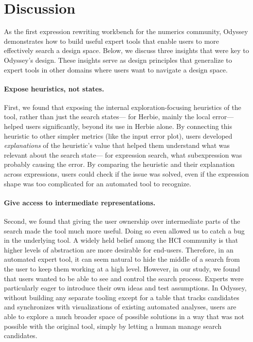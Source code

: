 \section{Discussion} \label{sec:discussion}
As the first expression rewriting workbench for the numerics community,
  Odyssey demonstrates how to build useful expert tools
  that enable users to more effectively search a design space. 
  Below, we discuss three insights that were key to Odyssey's design. 
  These insights serve as design principles that generalize to expert tools in other domains where users want to navigate a design space.

\paragraph{Expose heuristics, not states.}
  First, we found that exposing the internal exploration-focusing heuristics of the tool,
  rather than just the search states---%
  for Herbie, mainly the local error---helped users significantly,
  beyond its use in Herbie alone. %
By connecting this heuristic to other simpler metrics (like the input error plot), 
  users developed \textit{explanations} of the heuristic's value
  that helped them understand
  what was relevant about the search state---%
  for expression search,
  what subexpression was probably causing the error. 
By comparing the heuristic and their explanation across expressions, 
  users could check if the issue was solved, 
  even if the expression shape was too complicated for an automated tool to recognize.

  \paragraph{Give access to intermediate representations.}
  Second, we found that giving the user ownership over intermediate parts of the search
  made the tool much more useful. Doing so even allowed us to catch a bug in the underlying tool.
  A widely held belief among the HCI community is that higher levels of abstraction are more desirable for end-users. 
  Therefore, in an automated expert tool, it can seem natural to hide the middle of a search from the user to keep them working at a high level.
However, in our study, we found that users wanted to be able to see and control the search process. 
  Experts were particularly eager to introduce their own ideas and test assumptions.
In Odyssey, without building any separate tooling 
  except for a table that tracks candidates
  and synchronizes with visualizations of existing automated analyses, 
  users are able to explore a much broader space of possible solutions 
  in a way that was not possible with the original tool, 
  simply by letting a human manage search candidates.

